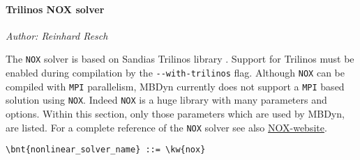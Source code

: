 \paragraph{Trilinos NOX solver}
\emph{Author: Reinhard Resch}

The \verb;NOX; solver is based on Sandias Trilinos library \cite{TRILINOS-WEBSITE}. Support for Trilinos must be enabled during compilation by the \verb;--with-trilinos; flag. Although \verb;NOX; can be compiled with \verb;MPI; parallelism, MBDyn currently does not support a \verb;MPI; based solution using \verb;NOX;.
Indeed \verb;NOX; is a huge library with many parameters and options. Within this section, only those parameters which are used by MBDyn, are listed. For a complete reference of the \verb;NOX; solver see also \href{https://trilinos.github.io/nox_and_loca.html}{NOX-website}.
\begin{Verbatim}[commandchars=\\\{\}]
    \bnt{nonlinear_solver_name} ::= \kw{nox}


\end{Verbatim}
